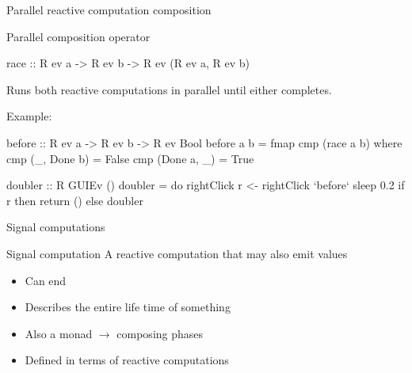 \documentclass{beamer}
\begin{document}
\begin{frame}{Parallel reactive computation composition}
\begin{block}{Parallel composition operator}
\begin{code}
race :: R ev a -> R ev b -> R ev (R ev a, R ev b)
\end{code}
Runs both reactive computations in parallel until either
completes.
\end{block}

Example: 
\begin{code}
before :: R ev a -> R ev b -> R ev Bool
before a b = fmap cmp (race a b) 
  where  cmp (_, Done b) = False
         cmp (Done a, _) = True

doubler :: R GUIEv ()
doubler = do  rightClick
              r <- rightClick `before` sleep 0.2
              if r then return () else doubler
\end{code}
\end{frame}
\begin{frame}{Signal computations}
\begin{block}{Signal computation}
A reactive computation that may also \alert{emit} values
\begin{itemize}
\item Can \alert{end}
\item Describes the entire life time of something
\item Also a monad $\rightarrow$ composing phases
\item Defined in terms of reactive computations
\end{itemize}

\end{block}
\pause
{}
\end{frame}
\end{document}

